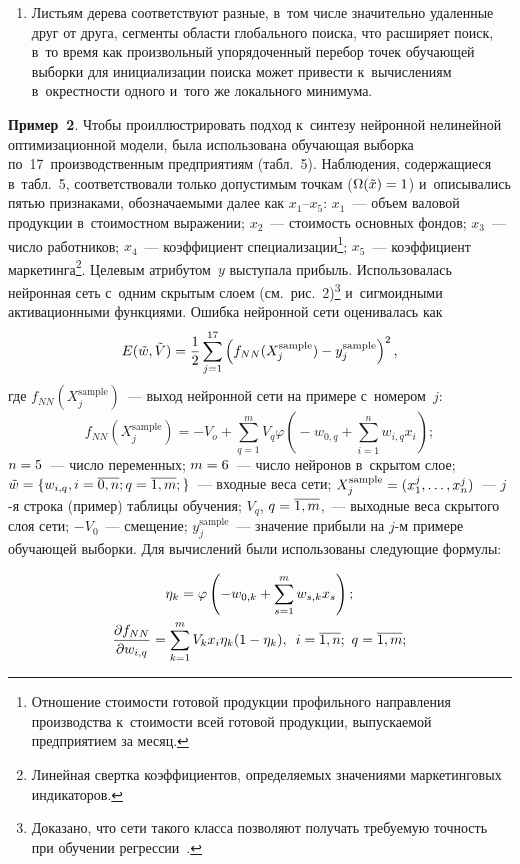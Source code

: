 \begin{multicols}{2}
\begin{enumerate}[1.]
\item 
Листьям дерева соответствуют разные, в~том числе значительно удаленные 
друг от друга, сегменты области глобального поиска, что  расширяет поиск, в~то 
время как произвольный упорядоченный перебор точек обучающей выборки 
для инициализации  поиска может привести к~вычислениям в~окрест\-ности 
одного и~того же локального минимума.
\end{enumerate}

\noindent
\textbf{Пример~2}. Чтобы проиллюстрировать подход к~синтезу 
нейронной нелинейной оптимизационной
модели, была использована обучающая выборка по~17~производственным 
предприятиям 
(табл.~5). Наблюдения,  содержащиеся в~табл.~5,
 соответствовали  только допустимым точкам  ($\Omega(\tilde{x})\hm=1$) 
 и~описывались
пятью признаками, обозначаемыми далее как  $x_1$--$x_5$:
$x_1$~--- объем валовой продукции в~стоимостном выражении;
$x_2$~--- стоимость основных фондов;
$x_3$~--- число работников;
$x_4$~--- коэффициент специализации\footnote{Отношение 
стоимости готовой продукции профильного направления производства 
к~стоимости всей готовой продукции, выпускаемой предприятием за месяц.};
$x_5$~--- коэффициент маркетинга\footnote{Линейная свертка коэффициентов, 
определяемых значениями маркетинговых индикаторов.}.
Целевым атрибутом~$y$  выступала прибыль.
Использовалась нейронная сеть с~одним скрытым слоем 
(см.\ рис.~2)\footnote{Доказано, что сети  такого класса 
позволяют получать требуемую точность при обучении регрессии~\cite{13-don}.} 
и~сигмоидными активационными функциями. Ошибка нейронной сети оценивалась как
$$
E(\tilde{w},\tilde{V})= \displaystyle\frac{\displaystyle 1\mathstrut}{\displaystyle 2\mathstrut} 
\sum\limits_{j=1}^{17} \left( f_{NN}(X_j^{\mathrm{sample}})-
y_j^{\mathrm{sample}} \right)^2,$$
где $f_{NN}(X_j^{\mathrm{sample}})$~---
выход нейронной сети на примере с~номером~$j$:
$$
f_{NN}(X_j^{\mathrm{sample}})=-V_o+\sum\limits_{q=1}^m \! V_q  \varphi 
\left(\! -w_{0,q}+ \sum\limits_{i=1}^n \! w_{i,q}x_i\! \right);
$$  
$n\hm=5$~--- 
число переменных;  $m\hm=6$~--- число нейронов в~скрытом слое;
$ \tilde{w}=\{w_{i,q}, i\hm=\overline{0,n}; q\hm=\overline{1,m};\}$~--- 
входные веса сети; $X_j^{\mathrm{sample}}\hm= (x_1^j,\dots,x_n^j)$~--- $j$-я 
строка (пример) таблицы обучения; $V_q$,  $q\hm=\overline{1,m}$,~--- 
выходные веса скрытого слоя сети;  $-V_0$~--- смещение; 
$y_j^{\mathrm{sample}}$~--- значение прибыли на $j$-м примере обучающей выборки.
Для вычислений были использованы следующие формулы: 

\noindent
\begin{gather*}
\eta_k=\varphi \left(-w_{0,k} +\sum\limits_{s=1}^m w_{s,k}x_s \right); \\
\displaystyle\frac{\displaystyle \partial f_{NN}\mathstrut}{\displaystyle \partial w_{i,q}\mathstrut}= 
\sum\limits_{k=1}^m V_k x_i \eta_k (1 - \eta_k), \enskip i=\overline{1,n}; \
\mathrm{}q=\overline{1,m};
\end{gather*}


\end{multicols}
